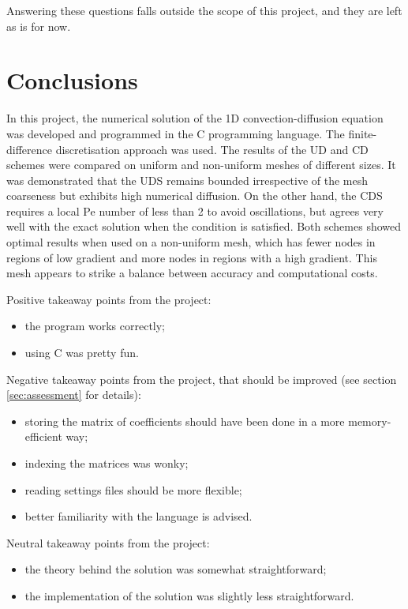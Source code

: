 \documentclass[12pt]{article}
\begin{document}
Answering these questions falls outside the scope of this project, and they are left as is for now.


\section{Conclusions}
\label{sec:conclusions}

In this project, the numerical solution of the 1D convection-diffusion equation was developed and programmed in the C programming language. The finite-difference discretisation approach was used. The results of the UD and CD schemes were compared on uniform and non-uniform meshes of different sizes. It was demonstrated that the UDS remains bounded irrespective of the mesh coarseness but exhibits high numerical diffusion. On the other hand, the CDS requires a local Pe number of less than 2 to avoid oscillations, but agrees very well with the exact solution when the condition is satisfied. Both schemes showed optimal results when used on a non-uniform mesh, which has fewer nodes in regions of low gradient and more nodes in regions with a high gradient. This mesh appears to strike a balance between accuracy and computational costs.

Positive takeaway points from the project:

\begin{itemize}
    \item the program works correctly;
    \item using C was pretty fun.
\end{itemize}

Negative takeaway points from the project, that should be improved (see section \ref{sec:assessment} for details):

\begin{itemize}
    \item storing the matrix of coefficients should have been done in a more memory-efficient way;
    \item indexing the matrices was wonky;
    \item reading settings files should be more flexible;
    \item better familiarity with the language is advised.
\end{itemize}

Neutral takeaway points from the project:

\begin{itemize}
    \item the theory behind the solution was somewhat straightforward;
    \item the implementation of the solution was slightly less straightforward.
\end{itemize}


\printbibliography[heading=bibintoc, title={Bibliography}]
\end{document}
